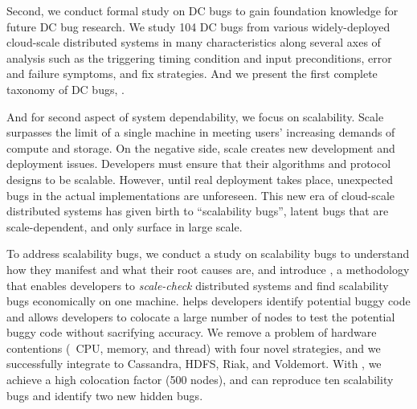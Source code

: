 Second, we conduct formal study on DC bugs to gain foundation knowledge for
future DC bug research. We study 104 DC bugs from various widely-deployed
cloud-scale distributed systems in many characteristics along several axes of
analysis such as the triggering timing condition and input preconditions, error
and failure symptoms, and fix strategies. And we present the first complete
taxonomy of DC bugs, \taxdc.

And for second aspect of system dependability, we focus on scalability. Scale
surpasses the limit of a single machine in meeting users' increasing demands of
compute and storage. On the negative side, scale creates new development and
deployment issues. Developers must ensure that their algorithms and protocol
designs to be scalable. However, until real deployment takes place, unexpected
bugs in the actual implementations are unforeseen. This new era of cloud-scale
distributed systems has given birth to ``scalability bugs'', latent bugs that
are scale-dependent, and only surface in large scale.

To address scalability bugs, we conduct a study on scalability bugs to
understand how they manifest and what their root causes are, and introduce \sck,
a methodology that enables developers to {\em scale-check} distributed systems
and find scalability bugs economically on one machine. \sck helps developers
identify potential buggy code and allows developers to colocate a large number
of nodes to test the potential buggy code without sacrifying accuracy. We remove
a problem of hardware contentions (\ie\ CPU, memory, and thread) with four novel
strategies, and we successfully integrate \sck to Cassandra, HDFS, Riak, and
Voldemort. With \sck, we achieve a high colocation factor (500 nodes), and can
reproduce ten scalability bugs and identify two new hidden bugs.
